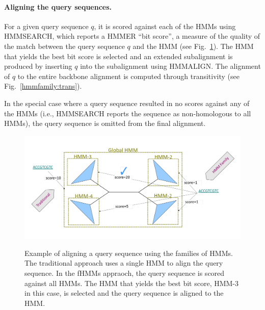 \paragraph{Aligning the query sequences.}
For a given query sequence $q$, it is scored against each of the HMMs using HMMSEARCH, which reports a HMMER ``bit score'', a measure of the quality of the match between the query sequence $q$ and the HMM (see Fig.~\ref{hmmfamily:alignment}).  The HMM that yields the best bit score is selected and an extended subalignment is produced by inserting $q$ into the subalignment using HMMALIGN.  The alignment of $q$ to the entire backbone alignment is computed through transitivity (see Fig.~\ref{hmmfamily:trans}).

In the special case where a query sequence resulted in no scores against any of the HMMs (i.e., HMMSEARCH reports the sequence as non-homologous to all HMMs), the query sequence is omitted from the final alignment.  

\begin{figure}[htbp]
\centering
{\includegraphics[width=1.0\textwidth]{hmmfamily/alignment}}
\caption[Example of alignment using HMM families.]{Example of aligning a query sequence using the families of HMMs.  The traditional approach uses a single HMM to align the query sequence.  In the fHMMs appraoch, the query sequence is scored against all HMMs.  The HMM that yields the best bit score, HMM-3 in this case, is selected and the query sequence is aligned to the HMM.} 
\label{hmmfamily:alignment}
\end{figure}

